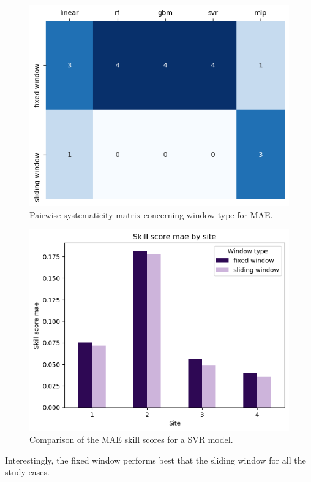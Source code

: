 \begin{figure}[htb!]
    \centering
    \includegraphics[width=\columnwidth]{figures/first_study/comp_window_mae.png}
\caption{Pairwise systematicity matrix concerning window type for MAE.}
\end{figure}

\begin{figure}[htb!]
    \centering
    \includegraphics[width=\columnwidth]{figures/first_study/comp_window_mae_svr.png}
\caption{Comparison of the MAE skill scores for a SVR model.}
\end{figure}

Interestingly, the fixed window performs best that the sliding window for all the study cases. 

